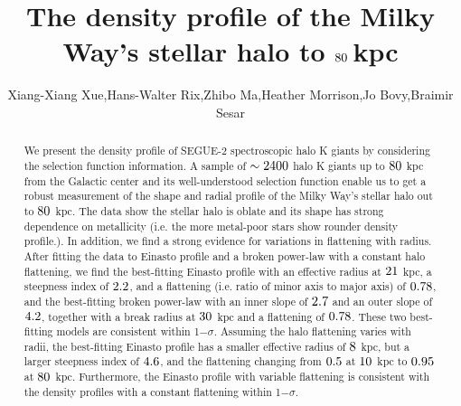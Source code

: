 \documentclass[12pt,preprint]{aastex}
\begin{document}
\title{The density profile of the Milky Way's stellar halo to $\rm 80~$kpc}
\author{Xiang-Xiang Xue,Hans-Walter Rix,Zhibo Ma,Heather Morrison,Jo Bovy,Braimir Sesar}
\begin{abstract}
We present the density profile of SEGUE-2 spectroscopic halo K giants by considering the selection function information. A sample of $\rm \sim2400$ halo K giants up to $\rm 80~$kpc from the Galactic center and its well-understood selection function enable us to get a robust measurement of the shape and radial profile of the Milky Way's stellar halo out to $\rm 80~$kpc. The data show the stellar halo is oblate and its shape has strong dependence on metallicity (i.e. the more metal-poor stars show rounder density profile.). In addition, we find a strong evidence for variations in flattening with radius. After fitting the data to Einasto profile and a broken power-law with a constant halo flattening, we find the best-fitting Einasto profile with an effective radius at $\rm 21~$kpc, a steepness index of $\rm 2.2$, and a flattening (i.e. ratio of minor axis to major axis) of $\rm 0.78$, and the best-fitting broken power-law with an inner slope of $\rm 2.7$ and an outer slope of $\rm 4.2$, together with a break radius at $\rm 30~$kpc and a flattening of $\rm 0.78$. These two best-fitting models are consistent within 1$-\sigma$. Assuming the halo flattening varies with radii, the best-fitting Einasto profile has a smaller effective radius of $\rm 8~$kpc, but a larger steepness index of $\rm 4.6$, and the flattening changing from $\rm 0.5$ at $\rm 10~$kpc to $\rm 0.95$ at $\rm 80~$kpc. Furthermore, the Einasto profile with variable flattening is consistent with the density profiles with a constant flattening within 1$-\sigma$.
\end{abstract}
\end{document}
